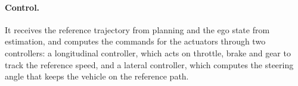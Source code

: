 \paragraph{Control.} It receives the reference trajectory from planning and the ego
state from estimation, and computes the commands for the actuators through two
controllers: a longitudinal controller, which acts on throttle, brake and gear to track
the reference speed, and a lateral controller, which computes the steering angle that
keeps the vehicle on the reference path.


\FloatBarrier
